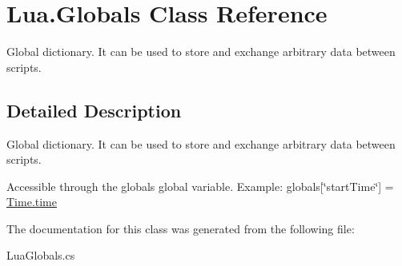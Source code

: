 \hypertarget{class_lua_1_1_globals}{}\section{Lua.\+Globals Class Reference}
\label{class_lua_1_1_globals}


Global dictionary. It can be used to store and exchange arbitrary data between scripts.  




\subsection{Detailed Description}
Global dictionary. It can be used to store and exchange arbitrary data between scripts. 

Accessible through the {\ttfamily globals} global variable. Example\+: {\ttfamily globals\mbox{[}\char`\"{}start\+Time\char`\"{}\mbox{]} = \mbox{\hyperlink{class_lua_1_1_time_a6a7753473015073c35d5ae5bc4edfdf3}{Time.\+time}}} 

The documentation for this class was generated from the following file\+:\begin{DoxyCompactItemize}
\item 
Lua\+Globals.\+cs\end{DoxyCompactItemize}
